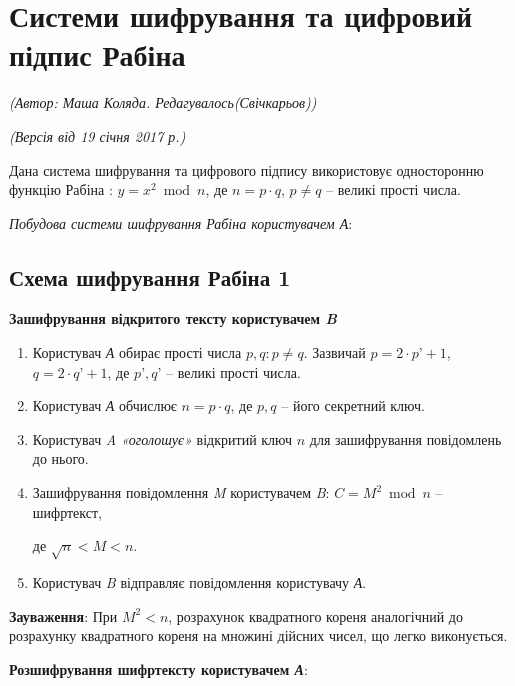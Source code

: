 \section{Системи шифрування та цифровий підпис Рабіна}
\begin{flushright}
\emph{(Автор: Маша Коляда. Редагувалось(Свічкарьов))}
\par \emph{(Версія від 19 січня 2017 р.)}
\end{flushright}

Дана система шифрування та цифрового підпису використовує односторонню функцію Рабіна : $y=x^2 \bmod n$, де $n=p \cdot q$, $p\ne q$ -- великі прості числа.

\textit{Побудова системи шифрування Рабіна користувачем А}:
\subsection{Схема шифрування Рабіна 1}

\begin{center}
 \textbf{Зашифрування відкритого тексту користувачем \textsl{B}}
\end{center}

\begin{enumerate}
        \item Користувач \textsl{А} обирає прості числа $p,q : p\ne q$. Зазвичай $p=2 \cdot p’+1$,  $q=2 \cdot q’+1$, де $p’, q’$ -- великі прості числа.
        \item Користувач \textsl{А} обчислює $n=p \cdot q$, де $p, q$ -- його секретний ключ.
        \item Користувач \textsl{A} \textit{«оголошує»} відкритий ключ $n$ для зашифрування повідомлень до нього.
        \item Зашифрування повідомлення \textsl{M} користувачем \textsl{B}: $ C=M^2 \bmod n$ – шифртекст, \par
         де $\sqrt{n}<M<n$.
        \item Користувач \textsl{B} відправляє повідомлення користувачу \textsl{А}.    
\end{enumerate}
\textbf{Зауваження}:  При $M^2<n$, розрахунок квадратного кореня аналогічний до розрахунку квадратного кореня на множині дійсних чисел, що легко виконується.\\

\begin{center}
\textbf{Розшифрування шифртексту користувачем  \textsl{А}}:
\end{center}

